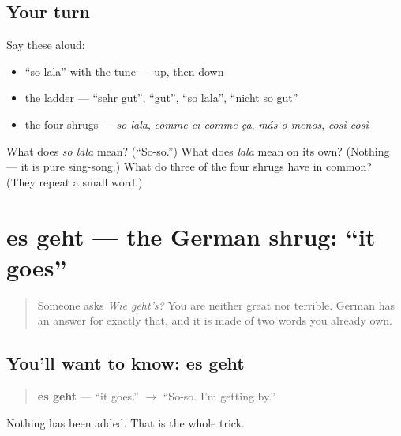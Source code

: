 \subsection*{Your turn}
Say these aloud:

\begin{itemize}
\raggedright
  \item \textquotedblleft{}so lala\textquotedblright{} with the tune — up, then down
  \item the ladder — \textquotedblleft{}sehr gut\textquotedblright{}, \textquotedblleft{}gut\textquotedblright{}, \textquotedblleft{}so lala\textquotedblright{}, \textquotedblleft{}nicht so gut\textquotedblright{}
  \item the four shrugs — \emph{so lala}, \emph{comme ci comme ça}, \emph{más o menos}, \emph{così così}
\end{itemize}

\begin{tcolorbox}[breakable,colback=teal!4,colframe=teal!35!black,title={Before you move on}]
What does \emph{so lala} mean? (\textquotedblleft{}So-so.\textquotedblright{}) What does \emph{lala} mean on its own? (Nothing — it is pure sing-song.) What do three of the four shrugs have in common? (They repeat a small word.)
\end{tcolorbox}
\section[es geht]{es geht — the German shrug: \textquotedblleft{}it goes\textquotedblright{}}

\label{lesson:GE-C03-es-geht}



\begin{quote}
Someone asks \emph{Wie geht's?} You are neither great nor terrible. German has an answer for exactly that, and it is made of two words you already own.
\end{quote}

\subsection*{You'll want to know: es geht}
\begin{quote}
\textbf{es geht} — \textquotedblleft{}it goes.\textquotedblright{} $\to$ \textquotedblleft{}So-so. I'm getting by.\textquotedblright{}
\end{quote}

Nothing has been added. That is the whole trick.

